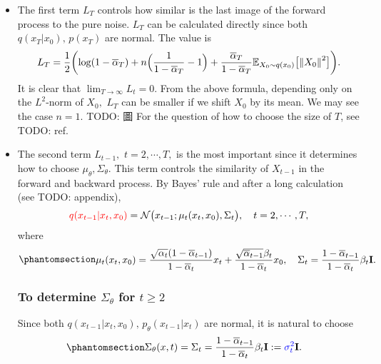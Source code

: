 \documentclass[
]{article}
\theoremstyle{remark}
\begin{document}
\begin{itemize}
\item
  The first term \(L_T\) controls how similar is the last image of the
  forward process to the pure noise. \(L_T\) can be calculated directly
  since both \(q(x_T \vert x_0),\, p(x_T)\) are normal. The value is \[
  \begin{aligned}
    L_T = \frac{1}{2} \biggl( \log (1-\overline{\alpha}_T) + n \Bigl( \frac{1}{1-\overline{\alpha}_T} - 1 \Bigr) + \frac{\overline{\alpha}_T}{1-\overline{\alpha}_T} \mathbb E_{X_0\sim q(x_0)}\bigl[ \left\lVert X_0 \right\rVert^2 \bigr] \biggr).
  \end{aligned}
  \] It is clear that \(\lim_{T\rightarrow\infty} L_t = 0.\) From the
  above formula, depending only on the \(L^2\)-norm of \(X_0,\) \(L_T\)
  can be smaller if we shift \(X_0\) by its mean. We may see the case
  \(n=1.\) TODO: 圖 For the question of how to choose the size of \(T\),
  see TODO: ref.
\item
  The second term \(L_{t-1},\) \(t=2,\cdots,T,\) is the most important
  since it determines how to choose \(\mu_{\theta},\Sigma_{\theta}.\)
  This term controls the similarity of \(X_{t-1}\) in the forward and
  backward process. By Bayes' rule and after a long calculation (see
  TODO: appendix), \[
  \begin{aligned}
    {\color{red}{q(x_{t-1} \vert x_t,x_0)}} = \mathcal{N}\bigl( x_{t-1}; \mu_{t}(x_t,x_0),\Sigma_t \bigr),
    \quad t = 2,\cdots,T,
  \end{aligned}
  \] where \begin{equation}\phantomsection\label{eq-mu_t}{
  \begin{aligned}
    \mu_{t}(x_t,x_0)  
    = \frac{\sqrt{\alpha_t}(1-\overline{\alpha}_{t-1})}{1-\overline{\alpha}_t}x_t + \frac{\sqrt{\overline{\alpha}_{t-1}}\beta_t}{1-\overline{\alpha}_t}x_0 ,
    \quad
    \Sigma_t = \frac{1-\overline{\alpha}_{t-1}}{1-\overline{\alpha}_t}\beta_t \mathbf{I}.
  \end{aligned}
  }\end{equation}

  \subsubsection{\texorpdfstring{To determine \(\Sigma_{\theta}\) for
  \(t\geq 2\)}{To determine \textbackslash Sigma\_\{\textbackslash theta\} for t\textbackslash geq 2}}\label{to-determine-sigma_theta-for-tgeq-2}

  Since both
  \(q(x_{t-1}\vert x_t, x_0),\, p_{\theta}(x_{t-1}\vert x_t)\) are
  normal, it is natural to choose
  \begin{equation}\phantomsection\label{eq-Sig_the_indep_x}{
  \begin{aligned}
    \Sigma_{\theta}(x,t) =
    \Sigma_t &= \frac{1-\overline{\alpha}_{t-1}}{1-\overline{\alpha}_t}\beta_t \mathbf{I}
    := {\color{blue}{\sigma_t^2}} \mathbf{I}.
  \end{aligned}
  }\end{equation}


\end{itemize}
\end{document}
